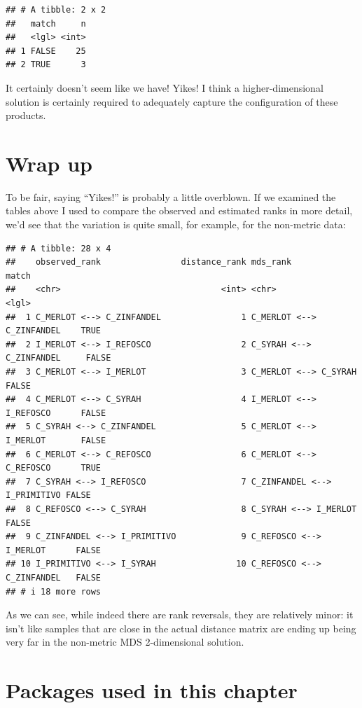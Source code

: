 \documentclass[
]{book}
\begin{document}
\begin{verbatim}
## # A tibble: 2 x 2
##   match     n
##   <lgl> <int>
## 1 FALSE    25
## 2 TRUE      3
\end{verbatim}

It certainly doesn't seem like we have! Yikes! I think a higher-dimensional solution is certainly required to adequately capture the configuration of these products.

\section{Wrap up}\label{wrap-up}

To be fair, saying ``Yikes!'' is probably a little overblown. If we examined the tables above I used to compare the observed and estimated ranks in more detail, we'd see that the variation is quite small, for example, for the non-metric data:

\begin{verbatim}
## # A tibble: 28 x 4
##    observed_rank                distance_rank mds_rank                     match
##    <chr>                                <int> <chr>                        <lgl>
##  1 C_MERLOT <--> C_ZINFANDEL                1 C_MERLOT <--> C_ZINFANDEL    TRUE 
##  2 I_MERLOT <--> I_REFOSCO                  2 C_SYRAH <--> C_ZINFANDEL     FALSE
##  3 C_MERLOT <--> I_MERLOT                   3 C_MERLOT <--> C_SYRAH        FALSE
##  4 C_MERLOT <--> C_SYRAH                    4 I_MERLOT <--> I_REFOSCO      FALSE
##  5 C_SYRAH <--> C_ZINFANDEL                 5 C_MERLOT <--> I_MERLOT       FALSE
##  6 C_MERLOT <--> C_REFOSCO                  6 C_MERLOT <--> C_REFOSCO      TRUE 
##  7 C_SYRAH <--> I_REFOSCO                   7 C_ZINFANDEL <--> I_PRIMITIVO FALSE
##  8 C_REFOSCO <--> C_SYRAH                   8 C_SYRAH <--> I_MERLOT        FALSE
##  9 C_ZINFANDEL <--> I_PRIMITIVO             9 C_REFOSCO <--> I_MERLOT      FALSE
## 10 I_PRIMITIVO <--> I_SYRAH                10 C_REFOSCO <--> C_ZINFANDEL   FALSE
## # i 18 more rows
\end{verbatim}

As we can see, while indeed there are rank reversals, they are relatively minor: it isn't like samples that are close in the actual distance matrix are ending up being very far in the non-metric MDS 2-dimensional solution.

\section{Packages used in this chapter}\label{packages-used-in-this-chapter-7}
\end{document}
